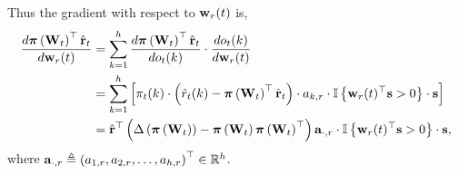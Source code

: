 \noindent Thus the gradient with respect to ${\mathbf{w}}_r(t)$ is,
\begin{equation*}
\label{eq:gradient_form_two}
\begin{split}
    \frac{d {\boldsymbol{\pi}}\left( {\mathbf{W}}_t \right)^\top \hat{{\mathbf{r}}}_t}{d {\mathbf{w}}_r(t)} &=  \sum\limits_{k=1}^{h}{ \frac{d {\boldsymbol{\pi}}\left( {\mathbf{W}}_t \right)^\top \hat{{\mathbf{r}}}_t}{d o_t(k)} \cdot \frac{d o_t(k)}{d {\mathbf{w}}_r(t)} }  \\
    &= \sum\limits_{k=1}^{h}{ \left[ \pi_t(k) \cdot \left( \hat{r}_{t}(k) - {\boldsymbol{\pi}}\left({\mathbf{W}}_t\right)^\top \hat{{\mathbf{r}}}_t \right) \cdot a_{k,r} \cdot {\mathbb{I}}\left\{ {\mathbf{w}}_r(t)^\top {\mathbf{s}} > 0 \right\} \cdot {\mathbf{s}}  \right] } \\
    &= \hat{{\mathbf{r}}}^\top \left( \Delta\left( {\boldsymbol{\pi}}\left({\mathbf{W}}_t\right) \right) - {\boldsymbol{\pi}}\left({\mathbf{W}}_t\right) {\boldsymbol{\pi}}\left({\mathbf{W}}_t\right)^\top \right) {\mathbf{a}}_{\cdot, r} \cdot {\mathbb{I}}\left\{ {\mathbf{w}}_r(t)^\top {\mathbf{s}} > 0 \right\} \cdot {\mathbf{s}},
\end{split}
\end{equation*}
where ${\mathbf{a}}_{\cdot, r} \triangleq \left( a_{1,r}, a_{2,r}, \dots, a_{h,r} \right)^\top \in {\mathbb{R}}^h$.

\fi